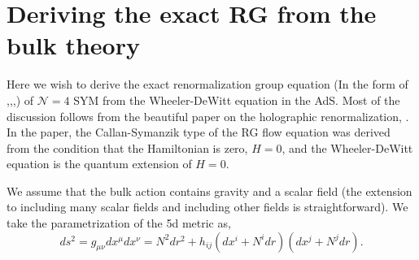 \documentclass[12pt,epsbox]{article}
\numberwithin{equation}{section}
\begin{document}


\section{Deriving the exact RG from the bulk theory }


Here we wish to derive the exact renormalization group equation (In the form of \cite{Morris},\cite{Morris2},\cite{Morris3},\cite{Oliver}) of $\mathcal{N}=4$ SYM from the Wheeler-DeWitt equation in the AdS. Most of the discussion follows from the beautiful paper on the holographic renormalization, \cite{dVV}. In the paper, the Callan-Symanzik type of the RG flow equation was derived from the condition that the Hamiltonian is zero, $H=0$, and the Wheeler-DeWitt equation is the quantum extension of $H=0$.

We assume that the bulk action contains gravity and a scalar field (the extension to including many scalar fields and including other fields is straightforward).
We take the parametrization of the 5d metric as,
\begin{equation}
ds^2 = g_{\mu\nu} dx^{\mu}dx^{\nu} = N^2 dr^2 +h_{ij}(dx^i +N^i dr)(dx^j +N^j dr).
\end{equation}
\end{document}
